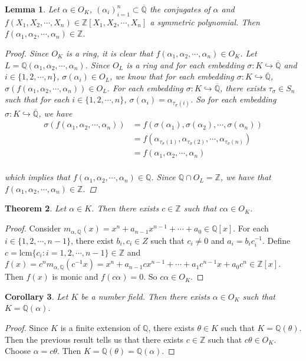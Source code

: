 \documentclass[12pt]{amsart}
\newtheorem{thm}{Theorem}[section]
\newtheorem{lem}[thm]{Lemma}
\newtheorem{cor}[thm]{Corollary}
\newcommand{\al}{\alpha}
\newcommand{\sig}{\sigma}
\newcommand{\Z}{\mathbb{Z}}
\newcommand{\Q}{\mathbb{Q}}
\begin{document}
\begin{lem}
Let $\al \in O_K$, $(\al_i)_{i=1}^n \subset \overline{\Q}$ the conjugates of $\al$ and $f(X_1, X_2,\cdots, X_n) \in \Z[X_1, X_2,\cdots, X_n]$ a symmetric polynomial. Then $f(\al_1, \al_2, \cdots, \al_n) \in \Z$.

\begin{proof}
Since $O_K$ is a ring, it is clear that $f(\al_1, \al_2, \cdots, \al_n) \in O_K$. Let $L = \Q(\al_1, \al_2, \cdots, \al_n)$. Since $O_L$ is a ring and for each embedding $\sig : K \hookrightarrow \overline{\Q}$ and $i \in \{1,2,\cdots,n\}$, $\sig(\al_i) \in O_L$, we know that for each embedding $\sig : K \hookrightarrow \overline{\Q}$, $\sig(f(\al_1, \al_2, \cdots, \al_n)) \in O_L$. For each embedding $\sig : K \hookrightarrow \overline{\Q}$, there exists $\tau_\sig \in S_n$ such that for each $i \in \{1,2,\cdots, n\}$, $\sig(\al_i) = \al_{\tau_{\sig}(i)}$. So for each embedding $\sig : K \hookrightarrow \overline{\Q}$, we have
\begin{align*}
\sig(f(\al_1, \al_2, \cdots, \al_n))
&= f(\sig(\al_1),\sig(\al_2), \cdots, \sig(\al_n)) \\
&= f(\al_{\tau_{\sig}(1)}, \al_{\tau_{\sig}(2)},\cdots, \al_{\tau_{\sig}(n)})\\
&= f(\al_1, \al_2, \cdots, \al_n) \\
\end{align*}

which implies that $f(\al_1, \al_2, \cdots, \al_n) \in \Q$. Since $\Q \cap O_L = \Z$, we have that $f(\al_1, \al_2, \cdots, \al_n) \in \Z$.
\end{proof}
\end{lem}

\begin{thm}
Let $\al \in K$. Then there exists $c \in \Z$ such that $c\al \in O_K$.
\end{thm}

\begin{proof}
Consider $m_{\al, \Q}(x) = x^n + a_{n-1}x^{n-1} + \cdots + a_0 \in \Q[x]$. For each $i \in \{1,2,\cdots,n-1\}$, there exist $b_i, c_i \in Z$ such that $c_i \neq 0$ and $a_i=b_ic_i^{-1}$. Define $c = \text{lcm} \{c_i:i=1,2,\cdots,n-1\} \in \Z$ and $f(x) = c^nm_{\al,\Q}(c^{-1}x) = x^n + a_{n-1}cx^{n-1} + \cdots+ a_1c^{n-1}x + a_0c^n \in \Z[x]$. Then $f(x)$ is monic and $f(c\al) =0$. So $c \al \in O_K$. 
\end{proof}

\begin{cor}
Let $K$ be a number field. Then there exists $\al \in O_K$ such that $K=\Q(\al)$. 
\end{cor}

\begin{proof}
Since $K$ is a finite extension of $\Q$, there exists $\theta \in K$ such that $K = \Q(\theta)$. Then the previous result tells us that there exists $c \in \Z$ such that $c\theta \in O_K$. Choose $\al = c\theta$. Then $K = \Q(\theta) = \Q(\al)$.
\end{proof}
\end{document}
